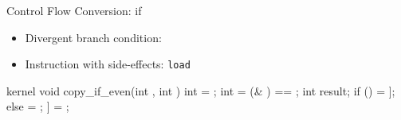 \begin{frame}[fragile]{Control Flow Conversion: if}

\begin{minipage}[t]{0.52\linewidth}

\begin{itemize}
    \item Divergent branch condition: 
    \item Instruction with side-effects: \texttt{load}
\end{itemize}

\begin{codebox}[commandchars=\\\[\]]
kernel void copy_if_even(int \uniform[*src], int \uniform[*dst]) {
  int \varying[tid] = ;
  int \varying[cond] = (\varying[tid] & \uniform[1]) == \uniform[0];
  int result;
  if (\varying[cond]) {
    \varying[result] = \uniform[src]\idx[\varying[tid]];
  } else {
    \uniform[result] = \uniform[-1];
  }
  \uniform[dst]\idx[\varying[tid]] = \varying[result];
}
\end{codebox}

\end{minipage}
\hspace{1em}
\begin{minipage}[t]{0.40\linewidth}

\vspace{0.1ex}


\end{minipage}

\end{frame}

